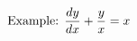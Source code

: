 \documentclass[preview]{standalone}
\begin{document}
\begin{align*}
\special{dvisvgm:raw <g id='unique000'>}\text{Example: } \frac{dy}{dx} + \frac{y}{x} = x\special{dvisvgm:raw </g>}
\end{align*}
\end{document}
